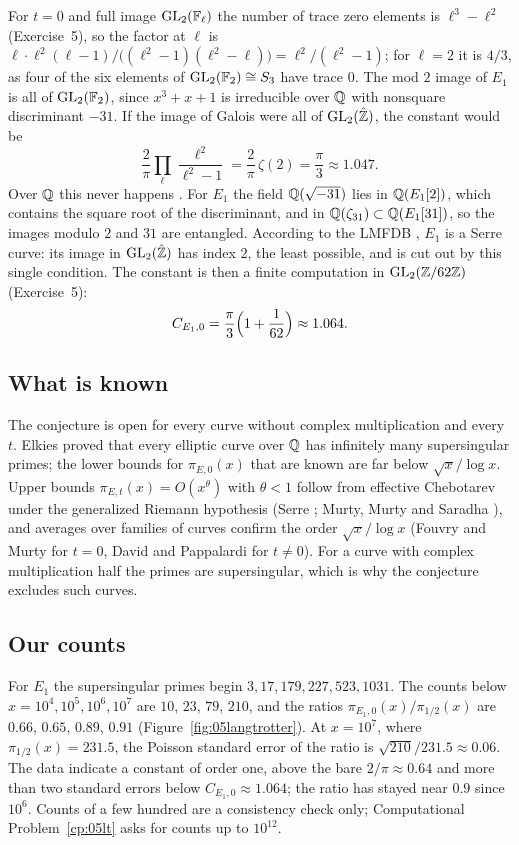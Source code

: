 For $t = 0$ and full image $\mathrm{GL}_2(\mathbb{F}_\ell)$ the number of trace zero elements is $\ell^3 - \ell^2$ (Exercise~5), so the factor at $\ell$ is $\ell\cdot\ell^2(\ell-1)/\bigl((\ell^2-1)(\ell^2-\ell)\bigr) = \ell^2/(\ell^2-1)$; for $\ell = 2$ it is $4/3$, as four of the six elements of $\mathrm{GL}_2(\mathbb{F}_2)\cong S_3$ have trace $0$. The mod $2$ image of $E_1$ is all of $\mathrm{GL}_2(\mathbb{F}_2)$, since $x^3+x+1$ is irreducible over $\mathbb{Q}$ with nonsquare discriminant $-31$. If the image of Galois were all of $\mathrm{GL}_2(\hat{\mathbb{Z}})$, the constant would be
\[
\frac2\pi\prod_\ell\frac{\ell^2}{\ell^2-1} = \frac2\pi\,\zeta(2) = \frac\pi3\approx1.047.
\]
Over $\mathbb{Q}$ this never happens \cite{serre1972}. For $E_1$ the field $\mathbb{Q}(\sqrt{-31})$ lies in $\mathbb{Q}(E_1[2])$, which contains the square root of the discriminant, and in $\mathbb{Q}(\zeta_{31})\subset\mathbb{Q}(E_1[31])$, so the images modulo $2$ and $31$ are entangled. According to the LMFDB \cite{lmfdb}, $E_1$ is a Serre curve: its image in $\mathrm{GL}_2(\hat{\mathbb{Z}})$ has index $2$, the least possible, and is cut out by this single condition. The constant is then a finite computation in $\mathrm{GL}_2(\mathbb{Z}/62\mathbb{Z})$ (Exercise~5):
\[
C_{E_1,0} = \frac\pi3\Bigl(1 + \frac1{62}\Bigr)\approx1.064.
\]

\subsection{What is known}

The conjecture is open for every curve without complex multiplication and every $t$. Elkies \cite{elkies1987} proved that every elliptic curve over $\mathbb{Q}$ has infinitely many supersingular primes; the lower bounds for $\pi_{E,0}(x)$ that are known are far below $\sqrt x/\log x$. Upper bounds $\pi_{E,t}(x) = O(x^{\theta})$ with $\theta < 1$ follow from effective Chebotarev under the generalized Riemann hypothesis (Serre \cite{serre1981}; Murty, Murty and Saradha \cite{murtymurtysaradha1988}), and averages over families of curves confirm the order $\sqrt x/\log x$ (Fouvry and Murty \cite{fouvrymurty1996} for $t = 0$, David and Pappalardi \cite{davidpappalardi1999} for $t\ne0$). For a curve with complex multiplication half the primes are supersingular, which is why the conjecture excludes such curves.

\subsection{Our counts}

For $E_1$ the supersingular primes begin $3, 17, 179, 227, 523, 1031$. The counts below $x = 10^4, 10^5, 10^6, 10^7$ are $10$, $23$, $79$, $210$, and the ratios $\pi_{E_1,0}(x)/\pi_{1/2}(x)$ are $0.66$, $0.65$, $0.89$, $0.91$ (Figure~\ref{fig:05langtrotter}). At $x = 10^7$, where $\pi_{1/2}(x) = 231.5$, the Poisson standard error of the ratio is $\sqrt{210}/231.5\approx0.06$. The data indicate a constant of order one, above the bare $2/\pi\approx0.64$ and more than two standard errors below $C_{E_1,0}\approx1.064$; the ratio has stayed near $0.9$ since $10^6$. Counts of a few hundred are a consistency check only; Computational Problem~\ref{cp:05lt} asks for counts up to $10^{12}$.

